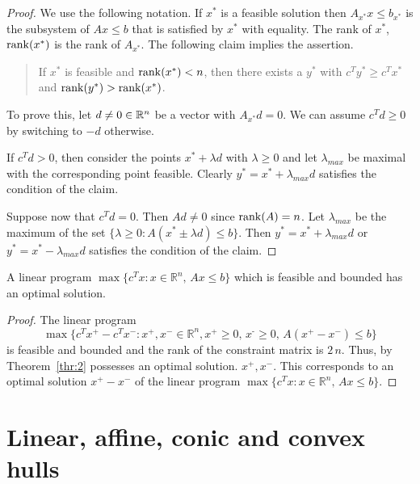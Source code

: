 \begin{proof}
  We use the following notation. If $x^*$ is a feasible solution then
  $A_{x^*} x \leq b_{x^*}$ is the subsystem of $Ax \leq b$ that is
  satisfied by $x^*$ with equality. The rank of $x^*$, $\mathrm{rank}(x^*)$ is
  the rank of $A_{x^*}$.  The following claim implies the assertion. 
  \begin{quote}
    If $x^*$ is feasible and $\mathrm{rank}(x^*) < n$, then there exists a
    $y^*$ with $c^T y^* \geq c^Tx^*$ and $\mathrm{rank}(y^*)>\mathrm{rank}(x^*)$.
  \end{quote}
  To prove this, let $d \neq 0 \in \mathbb{R}^n$ be a vector with $A_{x^*}d =
  0$.  We can assume $c^Td \geq 0$ by switching to $-d$ otherwise.

  If $c^Td >0$, then consider the points $x^* + \lambda d$ with
  $\lambda \geq 0$ and let $\lambda_{max}$ be maximal with the
  corresponding point feasible. Clearly $y^* = x^* + \lambda_{max} d$
  satisfies the condition of the claim. 

  Suppose now that  $c^T d = 0$. Then $A d \neq 0$ since $\mathrm{rank}(A) = n$. Let $\lambda_{max}$ be the maximum of the set $\{\lambda \geq 0 \colon A (x^* \pm \lambda d) \leq b\}$. Then $y^* = x^* + \lambda_{max}d$ or $y^* = x^* - \lambda_{max}d$  satisfies the condition of the claim. 
  
\end{proof}



\begin{corollary}
  \label{co:12}
  A linear program $\max \{ c^Tx : x ∈ ℝ^n, \, Ax ≤ b\}$ which is feasible and bounded has an optimal solution. 
\end{corollary}


\begin{proof}
  The linear program 
  \begin{displaymath}
    \max \{ c^Tx^+ -c^T x^- : x^+,x^- ∈ ℝ^n, x^+≥0, \, x^‐≥0, \, A(x^+-x^-) ≤ b\}
  \end{displaymath}
 is feasible and bounded and the rank of the constraint matrix is $2\,n$.  Thus, by Theorem~\ref{thr:2} possesses an optimal solution. $x^+,x^-$. This corresponds to an optimal solution $x^+-x^-$ of the linear program $\max \{ c^Tx : x ∈ ℝ^n, \, Ax ≤ b\}$. 
\end{proof}

\section{Linear, affine, conic  and convex hulls}
\label{conv:cha:linear-affine-convex}



